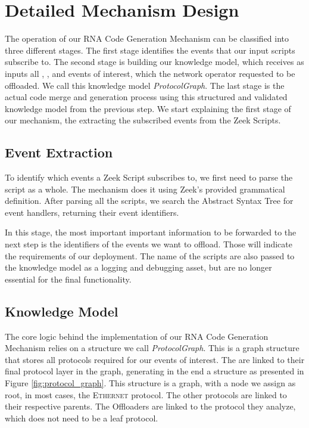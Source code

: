 \section{Detailed Mechanism Design}
\label{sec:code_gen_impl}

The operation of our RNA Code Generation Mechanism can be classified into three different stages. The first stage identifies the events that our input scripts subscribe to. The second stage is building our knowledge model, which receives as inputs all \ProtocolTemplates{}, \Offloaders{}, and events of interest, which the network operator requested to be offloaded. We call this knowledge model \textit{ProtocolGraph}. The last stage is the actual code merge and generation process using this structured and validated knowledge model from the previous step. We start explaining the first stage of our mechanism, the extracting the subscribed events from the Zeek Scripts.

\subsection{Event Extraction}

To identify which events a Zeek Script subscribes to, we first need to parse the script as a whole. The mechanism does it using Zeek's provided grammatical definition. After parsing all the scripts, we search the Abstract Syntax Tree for event handlers, returning their event identifiers.

In this stage, the most important important information to be forwarded to the next step is the identifiers of the events we want to offload. Those will indicate the requirements of our deployment. The name of the scripts are also passed to the knowledge model as a logging and debugging asset, but are no longer essential for the final functionality.

\subsection{Knowledge Model}

The core logic behind the implementation of our RNA Code Generation Mechanism relies on a structure we call \textit{ProtocolGraph}. This is a graph structure that stores all protocols required for our events of interest. The \Offloaders{} are linked to their final protocol layer in the graph, generating in the end a structure as presented in Figure \ref{fig:protocol_graph}. This structure is a graph, with a node we assign as root, in most cases, the \textsc{Ethernet} protocol. The other protocols are linked to their respective parents. The Offloaders are linked to the protocol they analyze, which does not need to be a leaf protocol.

